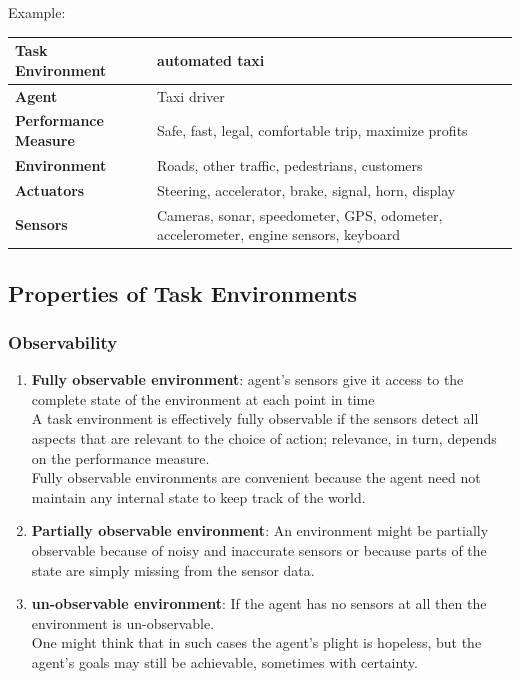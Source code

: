 Example:
\begin{customTableWrapper}{1.2}
\begin{table}[H]
    \centering
    \begin{tabular}{|l p{10cm}|}
        \hline
        \textbf{Task Environment} & automated taxi \\
        \hline\hline
        
        \textbf{Agent} & Taxi driver \\
        \hline

        \textbf{Performance Measure} & Safe, fast, legal, comfortable trip, maximize profits \\

        \textbf{Environment} & Roads, other traffic, pedestrians, customers \\

        \textbf{Actuators} & Steering, accelerator, brake, signal, horn, display \\

        \textbf{Sensors} & Cameras, sonar, speedometer, GPS, odometer, accelerometer, engine sensors, keyboard \\
        \hline
    \end{tabular}
\end{table}
\end{customTableWrapper}

\subsection{Properties of Task Environments}

\subsubsection{Observability}
\begin{enumerate}
    \item \textbf{Fully observable environment}: agent’s sensors give it access to the complete state of the environment at each point in time\\
    A task environment is effectively fully observable if the sensors detect all aspects that are relevant to the choice of action; relevance, in turn, depends on the performance measure.\\
    Fully observable environments are convenient because the agent need not maintain any internal state to keep track of the world. 

    \item \textbf{Partially observable environment}: An environment might be partially observable because of noisy and inaccurate sensors or because parts of the state are simply missing from the sensor data.

    \item \textbf{un-observable environment}: If the agent has no sensors at all then the environment is un-observable.\\
    One might think that in such cases the agent’s plight is hopeless, but the agent’s goals may still be achievable, sometimes with certainty. 

\end{enumerate}



